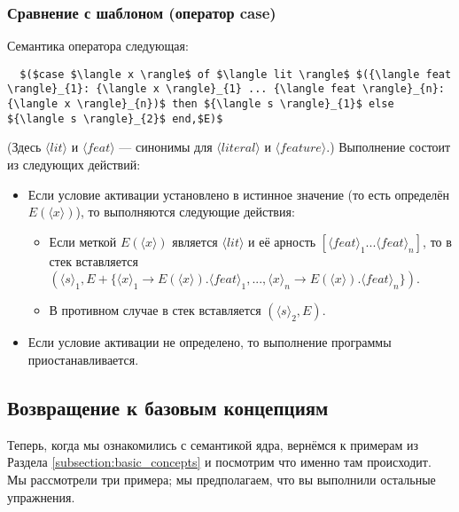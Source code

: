 \subsubsection{Сравнение с шаблоном (оператор case)}

Семантика оператора следующая:

\begin{lstlisting}
  $($case $\langle x \rangle$ of $\langle lit \rangle$ $({\langle feat \rangle}_{1}: {\langle x \rangle}_{1} ... {\langle feat \rangle}_{n}: {\langle x \rangle}_{n})$ then ${\langle s \rangle}_{1}$ else ${\langle s \rangle}_{2}$ end,$E)$
\end{lstlisting}

(Здесь $\langle lit \rangle$ и $\langle feat \rangle$ --- синонимы для $\langle literal \rangle$ и $\langle feature \rangle$.) Выполнение состоит из следующих действий:

\begin{itemize}
\item{Если условие активации установлено в истинное значение (то есть определён $E( \langle x \rangle)$), то выполняются следующие действия:

  \begin{itemize}
\item{Если меткой $E( \langle x \rangle)$ является $\langle lit \rangle$ и её арность $[ {\langle feat \rangle}_{1} ... {\langle feat \rangle}_{n}]$, то в стек вставляется $({ \langle s \rangle}_{1},E+ \{ { \langle x \rangle }_{1} \to E(\langle x \rangle).{ \langle feat \rangle }_{1}, ..., { \langle x \rangle }_{n} \to E(\langle x \rangle).{ \langle feat \rangle }_{n} \})$.}

\item{В противном случае в стек вставляется $( { \langle s \rangle }_{2},E)$.}
  \end{itemize}
}

\item{Если условие активации не определено, то выполнение программы приостанавливается.}
\end{itemize}

\subsection{Возвращение к базовым концепциям}

Теперь, когда мы ознакомились с семантикой ядра, вернёмся к примерам из Раздела \ref{subsection:basic_concepts} и посмотрим что именно там происходит. Мы рассмотрели три примера; мы предполагаем, что вы выполнили остальные упражнения.

